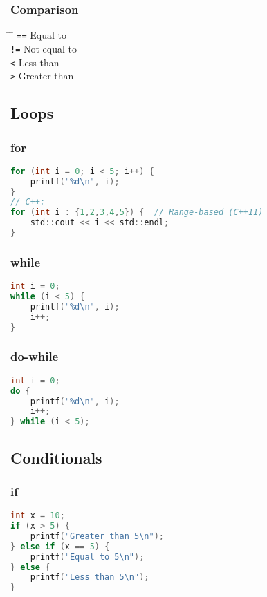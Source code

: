 \documentclass[a4paper,10pt]{article}
\begin{document}
\subsubsection*{Comparison}
\begin{tabbing}
	\= \hspace{30mm} \= \hspace{50mm} \kill
	\> \verb|==| \> Equal to \\
	\> \verb|!=| \> Not equal to \\
	\> \verb|<| \> Less than \\
	\> \verb|>| \> Greater than \\
\end{tabbing}

\subsection{Loops}
\subsubsection*{for}
\begin{lstlisting}[language=C]
for (int i = 0; i < 5; i++) {
    printf("%d\n", i);
}
// C++:
for (int i : {1,2,3,4,5}) {  // Range-based (C++11)
    std::cout << i << std::endl;
}
\end{lstlisting}

\subsubsection*{while}
\begin{lstlisting}[language=C]
int i = 0;
while (i < 5) {
    printf("%d\n", i);
    i++;
}
\end{lstlisting}

\subsubsection*{do-while}
\begin{lstlisting}[language=C]
int i = 0;
do {
    printf("%d\n", i);
    i++;
} while (i < 5);
\end{lstlisting}

\subsection{Conditionals}
\subsubsection*{if}
\begin{lstlisting}[language=C]
int x = 10;
if (x > 5) {
    printf("Greater than 5\n");
} else if (x == 5) {
    printf("Equal to 5\n");
} else {
    printf("Less than 5\n");
}
\end{lstlisting}
\end{document}
